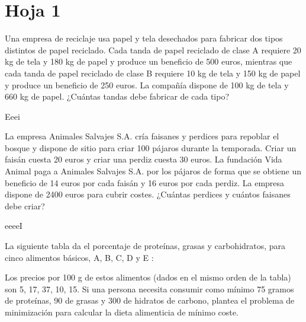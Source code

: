 
\section{Hoja 1}

\begin{problem}[1]

Una empresa de reciclaje usa papel y tela desechados para fabricar dos tipos distintos de papel
reciclado. Cada tanda de papel reciclado de clase A requiere 20 kg de tela y 180 kg de papel y
produce un beneficio de 500 euros, mientras que cada tanda de papel reciclado de clase B requiere
10 kg de tela y 150 kg de papel y produce un beneficio de 250 euros. La compañía dispone de 100
kg de tela y 660 kg de papel. ¿Cuántas tandas debe fabricar de cada tipo?

\solution

Eeei

\end{problem}


\begin{problem}[2]

La empresa Animales Salvajes S.A. cría faisanes y perdices para repoblar el bosque y dispone
de sitio para criar 100 pájaros durante la temporada. Criar un faisán cuesta 20 euros y criar una
perdiz cuesta 30 euros. La fundación Vida Animal paga a Animales Salvajes S.A. por los pájaros
de forma que se obtiene un beneficio de 14 euros por cada faisán y 16 euros por cada perdiz. La
empresa dispone de 2400 euros para cubrir costes. ¿Cuántas perdices y cuántos faisanes debe criar?
\solution 

eeeeI

\end{problem}


\begin{problem}[3]

La siguiente tabla da el porcentaje de proteínas, grasas y carbohidratos, para cinco alimentos
básicos, A, B, C, D y E :



Los precios por 100 g de estos alimentos (dados en el mismo orden de la tabla) son 5, 17, 37, 10,
15. Si una persona necesita consumir como mínimo 75 gramos de proteínas, 90 de grasas y 300 de
hidratos de carbono, plantea el problema de minimización para calcular la dieta alimenticia de
mínimo coste.
\solution


\end{problem}